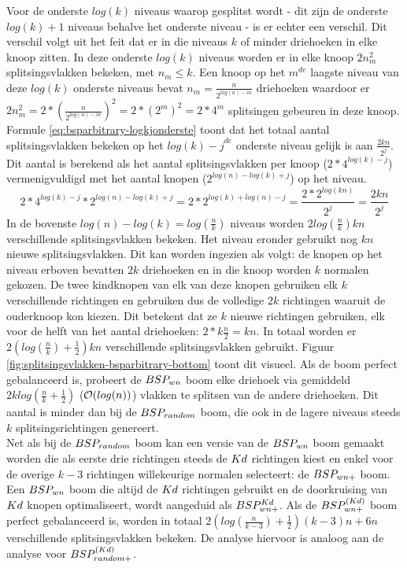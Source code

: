     Voor de onderste $log(k)$ niveaus waarop gesplitst wordt - dit zijn de onderste $log(k) + 1$ niveaus behalve het onderste niveau -  is er echter een verschil.
    Dit verschil volgt uit het feit dat er in die niveaus $k$ of minder driehoeken in elke knoop zitten.
    In deze onderste $log(k)$ niveaus worden er in elke knoop $2n_m^2$ splitsingsvlakken bekeken, met $n_m \leq k$.
    Een knoop op het $m^{de}$ laagste niveau van deze $log(k)$ onderste niveaus bevat $n_m = \frac{n}{2^{log(n) - m}}$ driehoeken waardoor er $2n_m^2 = 2 * (\frac{n}{2^{log(n) - m}})^2 = 2*(2^m)^2 = 2*4^m$ splitsingen gebeuren in deze knoop.
    Formule \ref{eq:bsparbitrary-logkjonderste} toont dat het totaal aantal splitsingsvlakken bekeken op het ${log(k) - j}^{de}$ onderste niveau gelijk is aan $\frac{2kn}{2^j}$. Dit aantal is berekend als het aantal splitsingsvlakken per knoop ($2*4^{log(k) - j}$) vermenigvuldigd met het aantal knopen ($2^{log(n)-log(k)+j}$) op het niveau.
    \begin{equation}
        \label{eq:bsparbitrary-logkjonderste}
    2*4^{log(k) - j} * 2^{log(n)-log(k)+j} = 2 * 2^{log(k) + log(n) - j} = \frac{2 * 2^{log(kn)}}{2^j} =\frac{2kn}{2^j}
    \end{equation}
    In de bovenste $log(n) - log(k) = log(\frac{n}{k})$ niveaus worden $2log(\frac{n}{k})kn$ verschillende splitsingsvlakken bekeken.
    Het niveau eronder gebruikt nog $kn$ nieuwe splitsingsvlakken.
    Dit kan worden ingezien als volgt: de knopen op het niveau erboven bevatten $2k$ driehoeken en in die knoop worden $k$ normalen gekozen. De twee kindknopen van elk van deze knopen gebruiken elk $k$ verschillende richtingen en gebruiken dus de volledige $2k$ richtingen waaruit de ouderknoop kon kiezen. Dit betekent dat ze $k$ nieuwe richtingen gebruiken, elk voor de helft van het aantal driehoeken: $2 * k\frac{n}{2} = kn$.
    In totaal worden er $2(log(\frac{n}{k}) + \frac{1}{2})kn$ verschillende splitsingsvlakken gebruikt.
    Figuur \ref{fig:splitsingsvlakken-bsparbitrary-bottom} toont dit visueel.
    Als de boom perfect gebalanceerd is, probeert de $BSP_{wn}$ boom elke driehoek via gemiddeld $2klog(\frac{n}{k} + \frac{1}{2})$ ($\mathcal{O}(log(n))$) vlakken te splitsen van de andere driehoeken. Dit aantal is minder dan bij de $BSP_{random}$ boom, die ook in de lagere niveaus steeds $k$ splitsingsrichtingen genereert.\\

    Net als bij de $BSP_{random}$ boom kan een versie van de $BSP_{wn}$ boom gemaakt worden die als eerste drie richtingen steeds de $Kd$ richtingen kiest en enkel voor de overige $k - 3$ richtingen willekeurige normalen selecteert: de $BSP_{wn+}$ boom. Een $BSP_{wn}$ boom die altijd de $Kd$ richtingen gebruikt en de doorkruising van $Kd$ knopen optimaliseert, wordt aangeduid als $BSP^{Kd}_{wn+}$. Als de $BSP^{(Kd)}_{wn+}$ boom perfect gebalanceerd is, worden in totaal $2(log(\frac{n}{k-3}) + \frac{1}{2})(k-3)n + 6n$ verschillende splitsingsvlakken bekeken. De analyse hiervoor is analoog aan de analyse voor $BSP^{(Kd)}_{random+}$.

